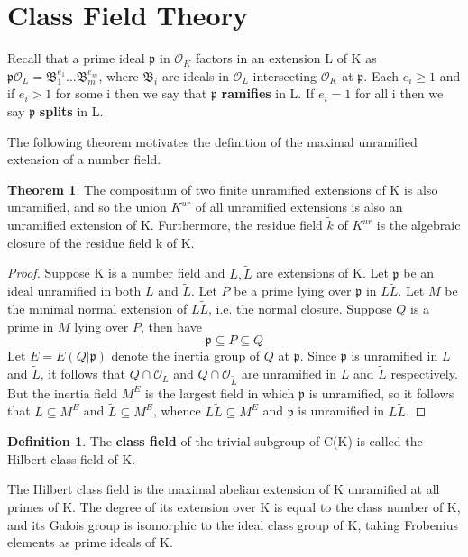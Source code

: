 \documentclass[12pt]{extarticle}
\newcommand{\<}{\langle}
\renewcommand{\>}{\rangle}
\theoremstyle{definition}
\newtheorem{theorem}{Theorem}
\newtheorem*{definition}{Definition}
\begin{document}
\section{Class Field Theory}
Recall that a prime ideal $\mathfrak{p}$ in $\mathcal{O}_K$ factors in an extension L of K as
$\mathfrak{p}\mathcal{O}_L=\mathfrak{B}_1^{e_1}...\mathfrak{B}_m^{e_m}$, where $\mathfrak{B}_i$ are ideals in $\mathcal{O}_L$ intersecting $\mathcal{O}_K$ at $\mathfrak{p}$. Each $e_i\geq1$ and if $e_i>1$ for some i then we say that $\mathfrak{p}$ \textbf{ramifies} in L. If $e_i=1$ for all i then we say $\mathfrak{p}$ \textbf{splits} in L.
\par
The following theorem  motivates the definition of the maximal unramified extension of a number field. 
\begin{theorem}
The compositum of two finite unramified extensions of K is also unramified, and so the union $K^{ur}$ of all unramified extensions is also an unramified extension of K. Furthermore, the residue field $\tilde{k}$ of $K^{ur}$ is the algebraic closure of the residue field k of K.
\end{theorem}
\begin{proof}
    Suppose K is a number field and $L,\tilde{L}$ are extensions of K. Let $\mathfrak{p}$ be an ideal unramified in both $L$ and $\tilde{L}$. Let $P$ be a prime lying over $\mathfrak{p}$ in $L\tilde{L}$. Let $M$ be the minimal normal extension of $L\tilde{L}$, i.e. the normal closure. Suppose $Q$ is a prime in $M$ lying over $P$, then have 
    \begin{equation}
        \mathfrak{p}\subseteq P \subseteq Q
    \end{equation}
    Let $E=E(Q|\mathfrak{p})$ denote the inertia group of $Q$ at $\mathfrak{p}$. 
    Since $\mathfrak{p}$ is unramified in $L$ and $\tilde{L}$, it follows that $Q \cap \mathcal{O}_L$ and $Q \cap \mathcal{O}_{\tilde{L}}$ are unramified in $L$ and $\tilde{L}$ respectively. 
 But the inertia field $M^E$ is the largest field in which $\mathfrak{p}$ is unramified, so it follows that $L\subseteq M^E$ and $\tilde{L} \subseteq M^E $, whence $L\tilde{L}\subseteq M^E$ and $\mathfrak{p}$ is unramified in $L\tilde{L}$.
\end{proof}
\begin{definition}
The \textbf{class field} of the trivial subgroup of C(K) is called the Hilbert class field of K. 
\end{definition}
The Hilbert class field is the maximal abelian extension of K unramified at all primes of K. The degree of its extension over K is equal to the class number of K, and its Galois group is isomorphic to the ideal class group of K, taking Frobenius elements as prime ideals of K.\par
\end{document}
